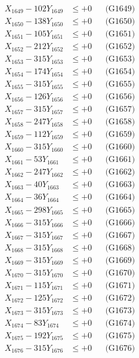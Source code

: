 \documentclass[a4paper,10pt]{article}
\begin{document}
{\begin{align}
X_{1649} - 102Y_{1649} &\leq +0 && \text{(G1649)} \\
X_{1650} - 138Y_{1650} &\leq +0 && \text{(G1650)} \\
\allowbreak
X_{1651} - 105Y_{1651} &\leq +0 && \text{(G1651)} \\
X_{1652} - 212Y_{1652} &\leq +0 && \text{(G1652)} \\
X_{1653} - 315Y_{1653} &\leq +0 && \text{(G1653)} \\
X_{1654} - 174Y_{1654} &\leq +0 && \text{(G1654)} \\
X_{1655} - 315Y_{1655} &\leq +0 && \text{(G1655)} \\
X_{1656} - 126Y_{1656} &\leq +0 && \text{(G1656)} \\
X_{1657} - 315Y_{1657} &\leq +0 && \text{(G1657)} \\
X_{1658} - 247Y_{1658} &\leq +0 && \text{(G1658)} \\
X_{1659} - 112Y_{1659} &\leq +0 && \text{(G1659)} \\
X_{1660} - 315Y_{1660} &\leq +0 && \text{(G1660)} \\
\allowbreak
X_{1661} - 53Y_{1661} &\leq +0 && \text{(G1661)} \\
X_{1662} - 247Y_{1662} &\leq +0 && \text{(G1662)} \\
X_{1663} - 40Y_{1663} &\leq +0 && \text{(G1663)} \\
X_{1664} - 36Y_{1664} &\leq +0 && \text{(G1664)} \\
X_{1665} - 298Y_{1665} &\leq +0 && \text{(G1665)} \\
X_{1666} - 315Y_{1666} &\leq +0 && \text{(G1666)} \\
X_{1667} - 315Y_{1667} &\leq +0 && \text{(G1667)} \\
X_{1668} - 315Y_{1668} &\leq +0 && \text{(G1668)} \\
X_{1669} - 315Y_{1669} &\leq +0 && \text{(G1669)} \\
X_{1670} - 315Y_{1670} &\leq +0 && \text{(G1670)} \\
\allowbreak
X_{1671} - 115Y_{1671} &\leq +0 && \text{(G1671)} \\
X_{1672} - 125Y_{1672} &\leq +0 && \text{(G1672)} \\
X_{1673} - 315Y_{1673} &\leq +0 && \text{(G1673)} \\
X_{1674} - 83Y_{1674} &\leq +0 && \text{(G1674)} \\
X_{1675} - 192Y_{1675} &\leq +0 && \text{(G1675)} \\
X_{1676} - 315Y_{1676} &\leq +0 && \text{(G1676)} \\

\end{align}}
\end{document}
